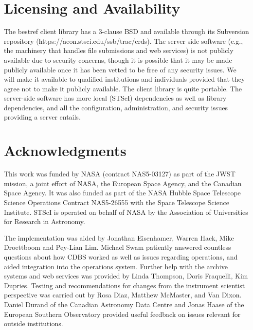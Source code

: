 \documentclass[final,authoryear,5p,times,twocolumn]{elsarticle}
\begin{document}
\section{Licensing and Availability}

The bestref client library has a 3-clause BSD and available through its
Subversion repository (https://aeon.stsci.edu/ssb/trac/crds). 
The server side software (e.g., the machinery that handles
file submissions and web services) is not publicly available due to security
concerns, though it is possible that it may be made publicly available once it
has been vetted to be free of any security issues. We will make it available to
qualified institutions and individuals provided that they agree not to make it
publicly available. The client library is quite portable. The server-side
software has more local (STScI) dependencies as well as library dependencies,
and all the configuration, administration, and security issues providing a
server entails.


\section{Acknowledgments}

This work was funded by NASA (contract NAS5-03127) as part of the JWST mission, a joint effort of NASA, the European Space Agency, and the Canadian Space Agency. It was also funded as part of the NASA Hubble Space Telescope Science Operations Contract NAS5-26555 with the Space Telescope Science Institute.
STScI is operated on behalf of NASA by the Association of Universities for Research in Astronomy.

The implementation was aided by Jonathan Eisenhamer, Warren Hack, Mike Droettboom
and Pey-Lian Lim. 
Michael Swam patiently answered countless questions about how CDBS
worked as well as issues regarding operations, and aided integration into the 
operations system. Further help with the archive systems and web services
was provided by Linda Thompson, Doris Fraquelli, Kim Dupries.
Testing and recommendations for changes from the instrument scientist
perspective was carried out by Rosa Diaz, Matthew McMaster, and Van Dixon.
Daniel Durand of the Canadian Astronomy Data Centre and Jonas Haase of the
European Southern Observatory provided useful feedback on issues relevant
for outside institutions.


\end{document}

